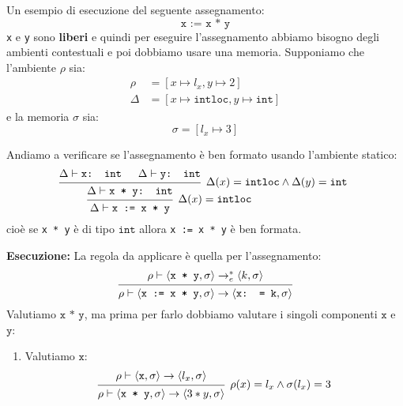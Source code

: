 \documentclass[a4paper]{article}
\begin{document}
\begin{Example}{}
Un esempio di esecuzione del seguente assegnamento:
\[
  \texttt{x := x * y}
\] 
\texttt{x} e \texttt{y} sono \textbf{liberi} e quindi per eseguire l'assegnamento
abbiamo bisogno degli ambienti contestuali e poi dobbiamo usare una memoria.
Supponiamo che l'ambiente \( \rho \) sia:
\[
  \begin{aligned}
    \rho &= \left[ x \mapsto l_x, y \mapsto 2 \right] \\
    \Delta &= \left[ x \mapsto \texttt{intloc}, y \mapsto \texttt{int} \right]
  \end{aligned}
\] 
e la memoria \( \sigma \) sia:
\[
  \sigma = \left[ l_x \mapsto 3 \right]
\] 

\vspace{1em}
\noindent
Andiamo a verificare se l'assegnamento è ben formato usando l'ambiente statico:
\[
  \begin{prooftree}
    \hypo{ 
      \Delta \vdash \texttt{x: int}
    }
    \hypo{ 
      \Delta \vdash \texttt{y: int}
    }
    \infer2[\( \Delta(x) = \texttt{intloc} \land \Delta(y) = \texttt{int} \) ]{ 
      \Delta \vdash \texttt{x * y: int}
    }
    \infer1[\( \Delta(x) = \texttt{intloc} \) ]{ 
      \Delta \vdash \texttt{x := x * y}
    }
  \end{prooftree}
\] 
cioè se \texttt{x * y} è di tipo \( \texttt{int} \) allora \texttt{x := x * y} è
ben formata.

\vspace{1em}
\noindent
\textbf{Esecuzione:}
La regola da applicare è quella per l'assegnamento:
\[
  \begin{prooftree}
    \hypo{ 
      \rho \vdash \left< \texttt{x * y}, \sigma \right> \to^*_e \left< k, \sigma \right>
    }
    \infer1{ 
      \rho \vdash \left< \texttt{x := x * y}, \sigma  \right>
      \to \left< \texttt{x: = k}, \sigma  \right>
    }
  \end{prooftree}
\] 
Valutiamo \( \texttt{x * y} \), ma prima per farlo dobbiamo valutare i singoli
componenti \( \texttt{x} \) e \( \texttt{y} \):
\begin{enumerate}
  \item Valutiamo \( \texttt{x} \):
    \[
      \begin{prooftree}
        \hypo{ 
          \rho \vdash \left< \texttt{x}, \sigma \right> \to \left< l_x, \sigma  \right>
        }
        \infer1[\( 
        \rho(x) = l_x \land \sigma(l_x) = 3
        \)]{ 
          \rho \vdash \left< \texttt{x * y}, \sigma \right> \to \left< 3 * y, \sigma  \right>
        }
      \end{prooftree}
    \] 


\end{enumerate}
\end{Example}
\end{document}
